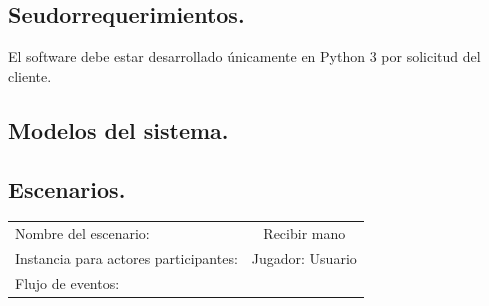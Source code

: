 \documentclass[60pt]{article}
\begin{document}
\subsection{Seudorrequerimientos.}\label{cap:seudorrequerimientos}
El software debe estar desarrollado únicamente en Python 3 por solicitud del cliente.
\subsection{Modelos del sistema.}\label{cap:modelos-sistema}

\subsection{Escenarios.}\label{cap:escenarios}

\begin{center}
    \begin{tabular}{ l | c  }
        Nombre del escenario:                 & Recibir mano     \\
        Instancia para actores participantes: & Jugador: Usuario \\\hline
        Flujo de eventos:                     &                  \\\hline
    \end{tabular}
\end{center}
\end{document}
